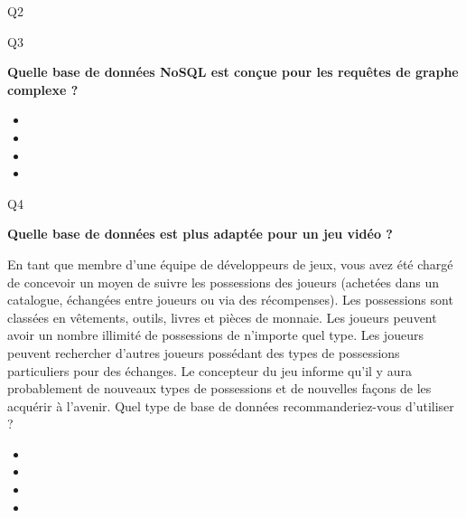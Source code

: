 {\begin{frame}{Q2}
    \end{frame}

    \begin{frame}{Q3}

        \textbf{Quelle base de données NoSQL est conçue pour les requêtes de
        graphe complexe ?}

        \begin{itemize}
            \item {}
            \item {}
            \item \quizanswer{\textcolor{kh-green}{Neo4j}}
            \item {}
        \end{itemize}


    \end{frame}

    \begin{frame}{Q4}

        \textbf{Quelle base de données est plus adaptée pour un jeu vidéo ?}

        En tant que membre d'une équipe de développeurs de jeux, vous avez été
        chargé de concevoir un moyen de suivre les possessions des joueurs
        (achetées dans un catalogue, échangées entre joueurs ou via des
        récompenses). Les possessions sont classées en vêtements, outils, livres
        et pièces de monnaie. Les joueurs peuvent avoir un nombre illimité de
        possessions de n'importe quel type. Les joueurs peuvent rechercher
        d'autres joueurs possédant des types de possessions particuliers pour
        des échanges. Le concepteur du jeu informe qu'il y aura probablement de
        nouveaux types de possessions et de nouvelles façons de les acquérir à
        l'avenir. Quel type de base de données recommanderiez-vous d'utiliser ?

        \begin{itemize}
            \item {}
            \item {}
            \item \quizanswer{\textcolor{kh-green}{Base de données orientée
                          document}}
            \item {}
        \end{itemize}


\end{frame}}
